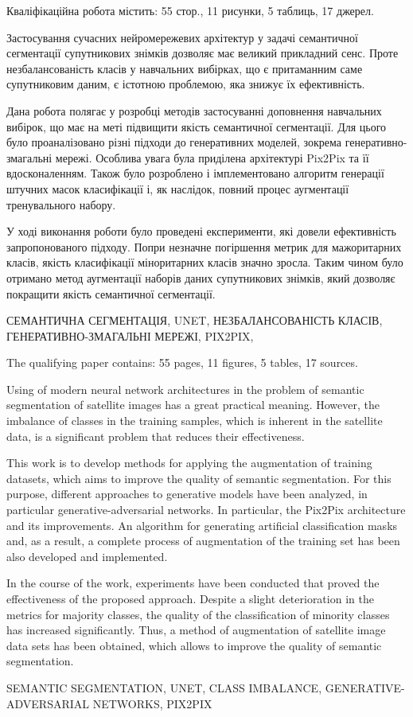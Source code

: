 
\abstractUkr

Кваліфікаційна робота містить: 55 стор., 11 рисунки, 5 таблиць, 17 джерел.

Застосування сучасних нейромережевих архітектур у
задачі семантичної сегментації супутникових знімків
дозволяє має великий прикладний сенс. Проте незбалансованість
класів у навчальних вибірках, що є притаманним
саме супутниковим даним, є істотною проблемою, яка
знижує їх ефективність.

Дана робота полягає у розробці методів
застосуванні доповнення навчальних вибірок, що має
на меті підвищити якість семантичної сегментації.
Для цього було проаналізовано різні підходи до генеративних
моделей, зокрема генеративно-змагальні мережі.
Особлива увага була приділена архітектурі Pix2Pix
та її вдосконаленням. Також було розроблено і імплементовано
алгоритм генерації штучних масок класифікації і, як наслідок,
повний процес аугментації тренувального набору.

У ході виконання роботи було проведені експерименти, які
довели ефективність запропонованого підходу. Попри незначне
погіршення метрик для мажоритарних класів, якість класифікації
міноритарних класів значно зросла. Таким чином було отримано
метод аугментації наборів даних супутникових знімків,
який дозволяє покращити якість семантичної сегментації.

\MakeUppercase{СЕМАНТИЧНА СЕГМЕНТАЦІЯ,
    UNET,  НЕЗБАЛАНСОВАНІСТЬ КЛАСІВ,
    ГЕНЕРАТИВНО-ЗМАГАЛЬНІ МЕРЕЖІ, PIX2PIX,}

\abstractEng

The qualifying paper contains: 55 pages, 11 figures, 5 tables, 17 sources.

Using of modern neural network architectures in
the problem of semantic segmentation of satellite images
has a great practical meaning. However, the imbalance
of classes in the training samples, which is inherent in the
satellite data, is a significant problem that reduces
their effectiveness.

This work is to develop methods for applying the
augmentation of training datasets, which aims to improve
the quality of semantic segmentation. For this purpose,
different approaches to generative models have been analyzed,
in particular generative-adversarial networks. In particular,
the Pix2Pix architecture and its
improvements. An algorithm for generating artificial
classification masks and, as a result, a complete process
of augmentation of the training set has been also developed
and implemented.

In the course of the work, experiments have been conducted
that proved the effectiveness of the proposed approach.
Despite a slight deterioration in the metrics for majority
classes, the quality of the classification of minority
classes has increased significantly. Thus, a method of
augmentation of satellite image data sets has been obtained,
which allows to improve the quality of semantic
segmentation.

\MakeUppercase{SEMANTIC SEGMENTATION, UNET,
    CLASS IMBALANCE, GENERATIVE-ADVERSARIAL NETWORKS,
    PIX2PIX}

\clearpage